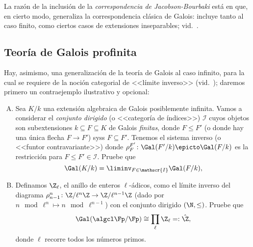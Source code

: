 \documentclass[11pt, reqno]{amsart}
\begin{document}
La razón de la inclusión de la \emph{correspondencia de Jacobson-Bourbaki} está en que, en cierto modo, generaliza la correspondencia
clásica de Galois: incluye tanto al caso finito, como ciertos casos de extensiones inseparables; vid.\ \cite{jacobson:galois}.

\begin{additional}
\section{Teoría de Galois profinita}
Hay, asimismo,
\lookup
una generalización de la teoría de Galois al caso infinito, para la cual se requiere de la noción categorial de <<límite
inverso>> (vid.\ \cite[490]{aluffi:algebra});
daremos primero un contraejemplo ilustrativo y opcional:
\begin{enumerate}[A., ref=\Alph*]
	\item\label{ex:galois_as_inv_lim}
		Sea $K/k$ una extensión algebraica de Galois posiblemente infinita.
		Vamos a considerar el \emph{conjunto dirigido} (o <<categoría de índices>>) $\mathscr{I}$ cuyos objetos son subextensiones $k
		\subseteq F \subseteq K$ de Galois \emph{finitas}, donde $F \le F'$ (o donde hay una única flecha $F \to F'$) syss
		$F \subseteq F'$.
		Tenemos el sistema inverso (o <<funtor contravariante>>) donde $\rho^{F'}_{F} \colon \Gal(F'/k) \epicto \Gal(F/k)$ es la
		restricción para $F \le F' \in \mathscr{I}$.
		Pruebe que
		\[
			\Gal(K/k) = \liminv_{F \in \mathscr{I}} \Gal(F/k),
		\]

	\item Definamos $\Z_\ell$, el anillo de enteros $\ell$-ádicos, como el límite inverso del diagrama $\rho^n_{n-1}\colon \Z/\ell^n\Z \to
		\Z/\ell^{n-1}\Z$ (dado por $n \mod{\ell^n} \mapsto n \mod{\ell^{n-1}}$) con el conjunto dirigido $(\N, \le)$.
		Pruebe que
		\[
			\Gal(\algcl\Fp/\Fp) \cong \prod_{\ell} \Z_\ell =: \hat{\Z},
		\]
		donde $\ell$ recorre todos los números primos.


\end{enumerate}
\end{additional}
\end{document}
